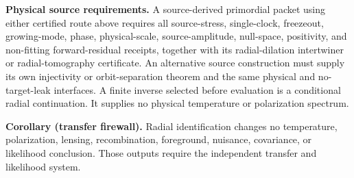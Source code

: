 \textbf{Physical source requirements.}
A source-derived primordial packet using either certified route above
requires all source-stress, single-clock, freezeout, growing-mode, phase,
physical-scale, source-amplitude, null-space, positivity, and non-fitting
forward-residual receipts, together with its radial-dilation intertwiner or
radial-tomography certificate. An alternative source construction must supply
its own injectivity or orbit-separation theorem and the same physical and
no-target-leak interfaces. A finite inverse selected before evaluation is a
conditional radial continuation. It supplies no physical temperature or
polarization spectrum.

\textbf{Corollary (transfer firewall).}
Radial identification changes no temperature, polarization, lensing,
recombination, foreground, nuisance, covariance, or likelihood conclusion.
Those outputs require the independent transfer and likelihood system.
